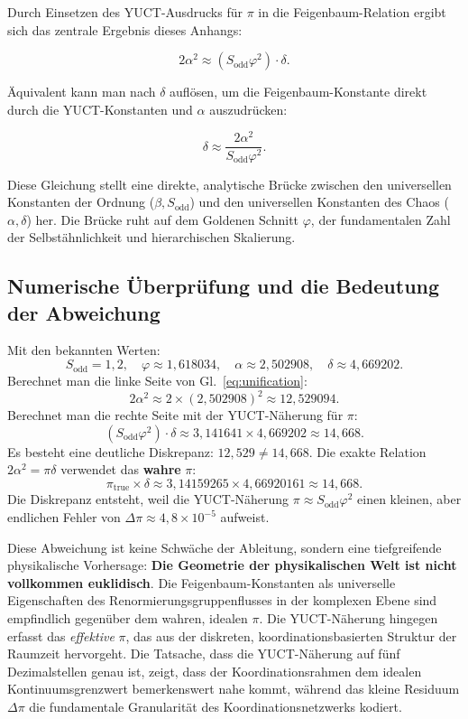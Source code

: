 \documentclass[12pt,a4paper]{article}
\begin{document}
	Durch Einsetzen des YUCT-Ausdrucks für \(\pi\) in die Feigenbaum-Relation ergibt sich das zentrale Ergebnis dieses Anhangs:
	
	\begin{equation}
		\boxed{2\alpha^2 \approx (S_{\mathrm{odd}}\varphi^2) \cdot \delta}.
		\label{eq:unification}
	\end{equation}
	
	Äquivalent kann man nach \(\delta\) auflösen, um die Feigenbaum-Konstante direkt durch die YUCT-Konstanten und \(\alpha\) auszudrücken:
	
	\begin{equation}
		\delta \approx \frac{2\alpha^2}{S_{\mathrm{odd}}\varphi^2}.
	\end{equation}
	
	Diese Gleichung stellt eine direkte, analytische Brücke zwischen den universellen Konstanten der Ordnung (\(\beta, S_{\mathrm{odd}}\)) und den universellen Konstanten des Chaos (\(\alpha, \delta\)) her. Die Brücke ruht auf dem Goldenen Schnitt \(\varphi\), der fundamentalen Zahl der Selbstähnlichkeit und hierarchischen Skalierung.
	
	\subsection{Numerische Überprüfung und die Bedeutung der Abweichung}
	
	Mit den bekannten Werten:
	\[
	S_{\mathrm{odd}} = 1{,}2, \quad \varphi \approx 1{,}618034, \quad \alpha \approx 2{,}502908, \quad \delta \approx 4{,}669202.
	\]
	Berechnet man die linke Seite von Gl.~\eqref{eq:unification}:
	\[
	2\alpha^2 \approx 2 \times (2{,}502908)^2 \approx 12{,}529094.
	\]
	Berechnet man die rechte Seite mit der YUCT-Näherung für \(\pi\):
	\[
	(S_{\mathrm{odd}}\varphi^2) \cdot \delta \approx 3{,}141641 \times 4{,}669202 \approx 14{,}668.
	\]
	Es besteht eine deutliche Diskrepanz: \(12{,}529 \neq 14{,}668\). Die exakte Relation \(2\alpha^2 = \pi \delta\) verwendet das \textbf{wahre} \(\pi\):
	\[
	\pi_{\mathrm{true}} \times \delta \approx 3{,}14159265 \times 4{,}66920161 \approx 14{,}668.
	\]
	Die Diskrepanz entsteht, weil die YUCT-Näherung \(\pi \approx S_{\mathrm{odd}}\varphi^2\) einen kleinen, aber endlichen Fehler von \(\Delta\pi \approx 4{,}8\times10^{-5}\) aufweist.
	
	Diese Abweichung ist keine Schwäche der Ableitung, sondern eine tiefgreifende physikalische Vorhersage: \textbf{Die Geometrie der physikalischen Welt ist nicht vollkommen euklidisch}. Die Feigenbaum-Konstanten als universelle Eigenschaften des Renormierungsgruppenflusses in der komplexen Ebene sind empfindlich gegenüber dem wahren, idealen \(\pi\). Die YUCT-Näherung hingegen erfasst das \textit{effektive} \(\pi\), das aus der diskreten, koordinationsbasierten Struktur der Raumzeit hervorgeht. Die Tatsache, dass die YUCT-Näherung auf fünf Dezimalstellen genau ist, zeigt, dass der Koordinationsrahmen dem idealen Kontinuumsgrenzwert bemerkenswert nahe kommt, während das kleine Residuum \(\Delta\pi\) die fundamentale Granularität des Koordinationsnetzwerks kodiert.
	
\end{document}
